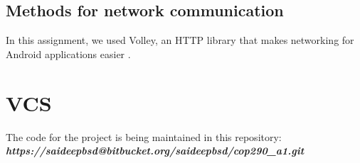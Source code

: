 \documentclass[12pt]{article}
\begin{document}
\subsection{Methods for network communication}
In this assignment, we used Volley, an HTTP library that makes networking for Android applications easier
\cite{Volley}. 
\newline
\section{VCS}
The code for the project is being maintained in this repository:\\
\textbf{{\em     https://saideepbsd@bitbucket.org/saideepbsd/cop290\_a1.git}}



\end{document}
